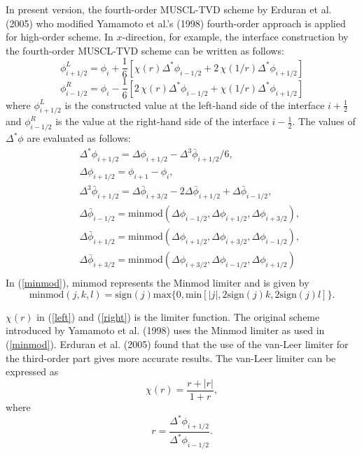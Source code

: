 \documentclass[11pt]{article}
\newcommand{\be}{\begin{equation}}
\newcommand{\ee}{\end{equation}}
\newcommand{\ba}{\begin{eqnarray}}
\newcommand{\ea}{\end{eqnarray}}
\begin{document}
In present version, the fourth-order MUSCL-TVD scheme by Erduran et al. (2005) who modified Yamamoto et al.'s (1998)  fourth-order approach is applied for high-order scheme.
In $x$-direction, for example, the interface construction by the fourth-order MUSCL-TVD scheme can be written as follows:
\be
\phi^L_{i+1/2} = \phi_i +\frac{1}{6} \left[ \chi(r) \Delta^* \phi_{i-1/2} + 2 \, \chi(1/r) \Delta^* \phi_{i+1/2} \right ]
\label{left}
\ee
\be
\phi^R_{i-1/2} = \phi_i -\frac{1}{6} \left[ 2 \, \chi(r) \Delta^* \phi_{i-1/2} + \chi(1/r) \Delta^* \phi_{i+1/2} \right ]
\label{right}
\ee
where $\phi^L_{i+1/2} $ is the constructed value at the left-hand side of the interface $i+\frac{1}{2}$ and  $\phi^R_{i-1/2} $ is the value at the right-hand side of the interface $i - \frac{1}{2}$.  The values of $\Delta^* \phi$ are evaluated as follows:
\ba
\nonumber
&&\Delta^* \phi_{i+1/2} = \Delta \phi_{i+1/2} - \Delta^3 \bar{\phi}_{i+1/2} /6, \\
\nonumber && \Delta \phi_{i+1/2} = \phi_{i+1} - \phi_{i} ,\\
\nonumber  && \Delta^3 \bar{\phi}_{i+1/2} = \Delta \bar{\phi}_{i+3/2} - 2 \Delta \bar{\phi}_{i+1/2} + \Delta \bar{\phi}_{i-1/2}, \\
\nonumber && \Delta \bar{\phi}_{i-1/2} =\mbox{minmod} (\Delta \phi_{i-1/2}, \Delta \phi_{i+1/2}, \Delta \phi_{i+3/2}) , \\
\nonumber &&  \Delta \bar{\phi}_{i+1/2} =\mbox{minmod} (\Delta \phi_{i+1/2}, \Delta \phi_{i+3/2}, \Delta \phi_{i-1/2}) , \\
\nonumber && \Delta \bar{\phi}_{i+3/2} =\mbox{minmod} (\Delta \phi_{i+3/2}, \Delta \phi_{i-1/2}, \Delta \phi_{i+1/2}) \\
\label{minmod}
\ea
In (\ref{minmod}), minmod represents the Minmod limiter and is given by
\be
\mbox{minmod} (j,k,l) = \mbox{sign} (j) \mbox{max} \{ 0, \mbox{min} [|j|, 2 \mbox{sign} (j) k, 2 \mbox{sign} (j) l ] \} .
\ee

$\chi(r)$ in (\ref{left}) and (\ref{right}) is the limiter function. The original scheme introduced by Yamamoto et al. (1998) uses the Minmod limiter as used in (\ref{minmod}).
Erduran et al. (2005) found that the use of the van-Leer limiter for the third-order part gives more accurate results.
The van-Leer limiter can be expressed as
\be
\chi(r) = \frac{r+|r|}{1+r},
\ee
where
\be
r = \frac{\Delta^* \phi_{i+1/2}}{\Delta ^* \phi_{i-1/2}}.
\ee
\end{document}
